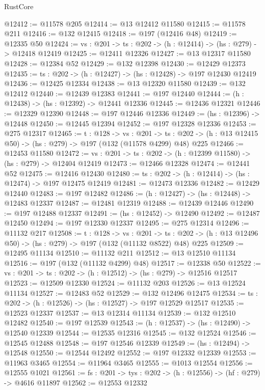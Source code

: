 \begin{lexlean}{RustCore}
\begin{coremodule}
@12412 := @11578 @205
@12414 := @13 @12412 @11580
@12415 := @11578 @211
@12416 := @132 @12415
@12418 := @197 (@12416 @48)
@12419 := @12335 @50
@12424 := {vs : @201} -> {ts : @202} -> (h : @12414) -> (hs : @279) -> @12418 @12419
@12425 := @12411 @12326
@12427 := @13 @12317 @11580
@12428 := @12384 @52
@12429 := @132 @12398
@12430 := @12429 @12373
@12435 := {ts : @202} -> (h : @12427) -> (hs : @12428) -> @197 @12430 @12419
@12436 := @12425 @12334
@12438 := @13 @12320 @11580
@12439 := @132 @12412
@12440 := @12439 @12383
@12441 := @197 @12440
@12444 := (h : @12438) -> (hs : @12392) -> @12441 @12336
@12445 := @12436 @12321
@12446 := @12329 @12390
@12448 := @197 @12446 @12336
@12449 := (hs : @12396) -> @12448
@12450 := @12445 @12394
@12452 := @197 @12328 @12336
@12453 := @275 @12317
@12465 := {t : @128} ->
  {vs : @201} ->
  {ts : @202} -> (h : @13 @12415 @50) -> (hs : @279) -> @197 (@132 (@11578 @4299) @48) @225
@12466 := @12453 @11580
@12472 := {vs : @201} -> {ts : @202} -> (h : @12399 @11580) -> (hs : @279) -> @12404 @12419
@12473 := @12466 @12328
@12474 := @12441 @52
@12475 := @12416 @12430
@12480 := {ts : @202} -> (h : @12414) -> (hs : @12474) -> @197 @12475 @12419
@12481 := @12473 @12336
@12482 := @12429 @12440
@12483 := @197 @12482
@12486 := (h : @12427) -> (hs : @12448) -> @12483 @12337
@12487 := @12481 @12319
@12488 := @12439 @12446
@12490 := @197 @12488 @12337
@12491 := (hs : @12452) -> @12490
@12492 := @12487 @12450
@12494 := @197 @12330 @12337
@12495 := @275 @12314
@12496 := @11132 @217
@12508 := {t : @128} ->
  {vs : @201} ->
  {ts : @202} -> (h : @13 @12496 @50) -> (hs : @279) -> @197 (@132 (@11132 @8522) @48) @225
@12509 := @12495 @11134
@12510 := @11132 @211
@12512 := @13 @12510 @11134
@12516 := @197 (@132 (@11132 @4299) @48)
@12517 := @12338 @50
@12522 := {vs : @201} -> {ts : @202} -> (h : @12512) -> (hs : @279) -> @12516 @12517
@12523 := @12509 @12330
@12524 := @11132 @203
@12526 := @13 @12524 @11134
@12527 := @12483 @52
@12529 := @132 @12496 @12475
@12534 := {ts : @202} -> (h : @12526) -> (hs : @12527) -> @197 @12529 @12517
@12535 := @12523 @12337
@12537 := @13 @12314 @11134
@12539 := @132 @12510 @12482
@12540 := @197 @12539
@12543 := (h : @12537) -> (hs : @12490) -> @12540 @12339
@12544 := @12535 @12316
@12545 := @132 @12524
@12546 := @12545 @12488
@12548 := @197 @12546 @12339
@12549 := (hs : @12494) -> @12548
@12550 := @12544 @12492
@12552 := @197 @12332 @12339
@12553 := @11963 @3465
@12554 := @11964 @3465
@12555 := @1013 @12554
@12556 := @12555 @1021
@12561 := {fs : @201} -> {tys : @202} -> (h : @12556) -> (hf : @279) -> @4616 @11897
@12562 := @12553 @12332

\end{coremodule}
\end{lexlean}

